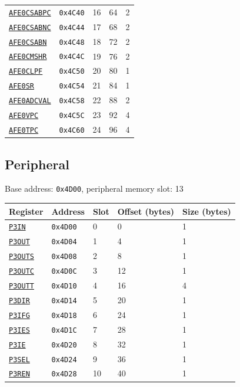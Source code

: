 \begin{tabularx}{\textwidth}{ l l l l X }
\hyperref[ss:AFExCSABPC]{\texttt{AFE0CSABPC}} & \texttt{0x4C40} & 16 & 64 & 2 \\
\rowcolor{tablehighlightcolor} \hyperref[ss:AFExCSABNC]{\texttt{AFE0CSABNC}} & \texttt{0x4C44} & 17 & 68 & 2 \\
\hyperref[ss:AFExCSABN]{\texttt{AFE0CSABN}} & \texttt{0x4C48} & 18 & 72 & 2 \\
\rowcolor{tablehighlightcolor} \hyperref[ss:AFExCMSHR]{\texttt{AFE0CMSHR}} & \texttt{0x4C4C} & 19 & 76 & 2 \\
\hyperref[ss:AFExCLPF]{\texttt{AFE0CLPF}} & \texttt{0x4C50} & 20 & 80 & 1 \\
\rowcolor{tablehighlightcolor} \hyperref[ss:AFExSR]{\texttt{AFE0SR}} & \texttt{0x4C54} & 21 & 84 & 1 \\
\hyperref[ss:AFExADCVAL]{\texttt{AFE0ADCVAL}} & \texttt{0x4C58} & 22 & 88 & 2 \\
\rowcolor{tablehighlightcolor} \hyperref[ss:AFExVPC]{\texttt{AFE0VPC}} & \texttt{0x4C5C} & 23 & 92 & 4 \\
\hyperref[ss:AFExTPC]{\texttt{AFE0TPC}} & \texttt{0x4C60} & 24 & 96 & 4 \\
\hline
\end{tabularx}

\subsection{ Peripheral}
\noindent Base address: \texttt{0x4D00}, peripheral memory slot: 13

\begin{tabularx}{\textwidth}{ l l l l X }
\textbf{Register} & \textbf{Address} & \textbf{Slot} & \textbf{Offset (bytes)} & \textbf{Size (bytes)} \\ \hline
\hyperref[ss:PxIN]{\texttt{P3IN}} & \texttt{0x4D00} & 0 & 0 & 1 \\
\rowcolor{tablehighlightcolor} \hyperref[ss:PxOUT]{\texttt{P3OUT}} & \texttt{0x4D04} & 1 & 4 & 1 \\
\hyperref[ss:PxOUTS]{\texttt{P3OUTS}} & \texttt{0x4D08} & 2 & 8 & 1 \\
\rowcolor{tablehighlightcolor} \hyperref[ss:PxOUTC]{\texttt{P3OUTC}} & \texttt{0x4D0C} & 3 & 12 & 1 \\
\hyperref[ss:PxOUTT]{\texttt{P3OUTT}} & \texttt{0x4D10} & 4 & 16 & 4 \\
\rowcolor{tablehighlightcolor} \hyperref[ss:PxDIR]{\texttt{P3DIR}} & \texttt{0x4D14} & 5 & 20 & 1 \\
\hyperref[ss:PxIFG]{\texttt{P3IFG}} & \texttt{0x4D18} & 6 & 24 & 1 \\
\rowcolor{tablehighlightcolor} \hyperref[ss:PxIES]{\texttt{P3IES}} & \texttt{0x4D1C} & 7 & 28 & 1 \\
\hyperref[ss:PxIE]{\texttt{P3IE}} & \texttt{0x4D20} & 8 & 32 & 1 \\
\rowcolor{tablehighlightcolor} \hyperref[ss:PxSEL]{\texttt{P3SEL}} & \texttt{0x4D24} & 9 & 36 & 1 \\
\hyperref[ss:PxREN]{\texttt{P3REN}} & \texttt{0x4D28} & 10 & 40 & 1 \\
\hline
\end{tabularx}

